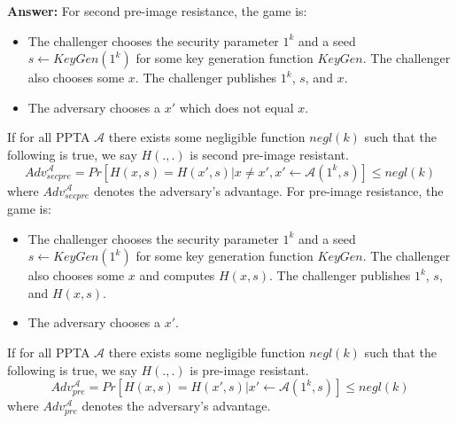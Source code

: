 \documentclass[10pt]{article}
\begin{document}
\begin{enumerate}
	\textbf{Answer:} \newline 
    For second pre-image resistance, the game is:
    \begin{itemize}
    \item The challenger chooses the security parameter $1^k$ and a seed $s\leftarrow KeyGen(1^k)$ for some key generation function $KeyGen$. The challenger also chooses some $x$. The challenger publishes $1^k$, $s$, and $x$.
    \item The adversary chooses a $x'$ which does not equal $x$.
    \end{itemize}
    If for all PPTA $\mathcal{A}$ there exists some negligible function $negl(k)$ such that the following is true, we say $H(.,.)$ is second pre-image resistant.
    \begin{displaymath}
    Adv^{\mathcal{A}}_{secpre} = Pr[H(x,s)=H(x',s)|x\ne x', x'\leftarrow \mathcal{A}(1^k,s)]\le negl(k)
    \end{displaymath}
    where $Adv^{\mathcal{A}}_{secpre}$ denotes the adversary's advantage.
    \newline
    \newline
    For pre-image resistance, the game is:
    \begin{itemize}
    \item The challenger chooses the security parameter $1^k$ and a seed $s\leftarrow KeyGen(1^k)$ for some key generation function $KeyGen$. The challenger also chooses some $x$ and computes $H(x,s)$. The challenger publishes $1^k$, $s$, and $H(x,s)$.
    \item The adversary chooses a $x'$.
    \end{itemize}
    If for all PPTA $\mathcal{A}$ there exists some negligible function $negl(k)$ such that the following is true, we say $H(.,.)$ is pre-image resistant.
    \begin{displaymath}
    Adv^{\mathcal{A}}_{pre} = Pr[H(x,s)=H(x',s)|x'\leftarrow \mathcal{A}(1^k,s)]\le negl(k)
    \end{displaymath}
    where $Adv^{\mathcal{A}}_{pre}$ denotes the adversary's advantage.
    
	
\end{enumerate}
\end{document}
